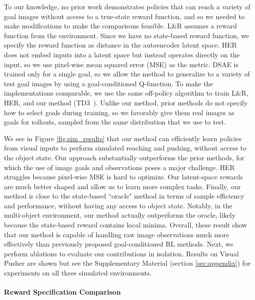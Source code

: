 To our knowledge, no prior work demonstrates policies that can reach a variety of goal images without access to a true-state reward function, and so we needed to make modifications to make the comparisons feasible.
L\&R assumes a reward function from the environment.
Since we have no state-based reward function, we specify the reward function as distance in the autoencoder latent space.
HER does not embed inputs into a latent space but instead operates directly on the input, so we use pixel-wise mean squared error (MSE) as the metric.
DSAE is trained only for a single goal, so we allow the method to generalize to a variety of test goal images by using a goal-conditioned Q-function.
To make the implementations comparable, we use the same off-policy algorithm to train L\&R, HER, and our method (TD3~\citep{fujimoto2018td3}).
Unlike our method, prior methods do not specify how to select goals during training, so we favorably give them real images as goals for rollouts, sampled from the same distribution that we use to test.

We see in Figure \ref{fig:sim_results} that our method can efficiently learn policies from visual inputs to perform simulated reaching and pushing, without access to the object state.
Our approach substantially outperforms the prior methods, for which the use of image goals and observations poses a major challenge.
HER struggles because pixel-wise MSE is hard to optimize. Our latent-space rewards are much better shaped and allow us to learn more complex tasks.
Finally, our method is close to the state-based ``oracle" method in terms of sample efficiency and performance, without having any access to object state.
Notably, in the multi-object environment, our method actually outperforms the oracle, likely because the state-based reward contains local minima.
Overall, these result show that our method is capable of handling raw image observations much more effectively than previously proposed goal-conditioned RL methods. Next, we perform ablations to evaluate our contributions in isolation. Results on Visual Pusher are shown but see the Supplementary Material (section \ref{sec:appendix}) for experiments on all three simulated environments.

\paragraph{Reward Specification Comparison}


